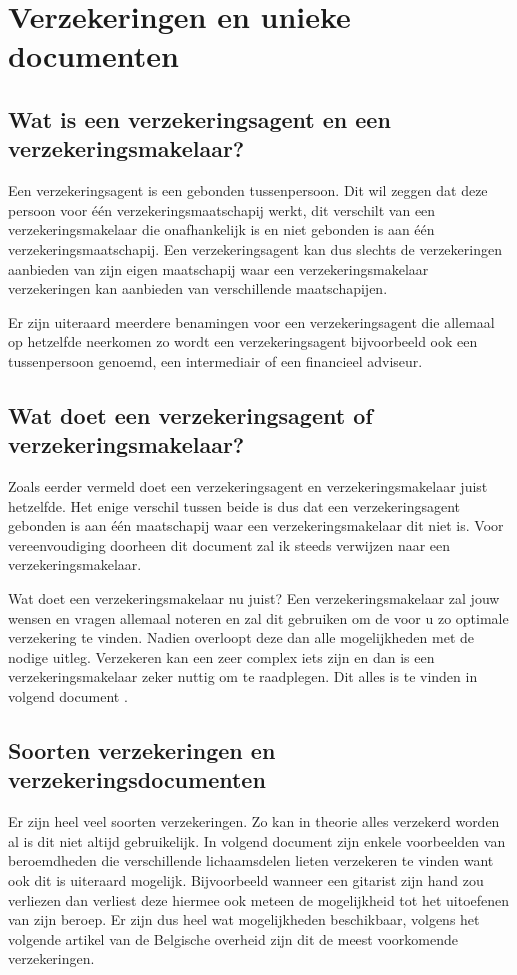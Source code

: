 \section{Verzekeringen en unieke documenten}
\subsection{Wat is een verzekeringsagent en een verzekeringsmakelaar?}
Een verzekeringsagent is een gebonden tussenpersoon. Dit wil zeggen dat deze persoon voor één verzekeringsmaatschapij werkt, dit verschilt van een verzekeringsmakelaar die onafhankelijk is en niet gebonden is aan één verzekeringsmaatschapij. Een verzekeringsagent kan dus slechts de verzekeringen aanbieden van zijn eigen maatschapij waar een verzekeringsmakelaar verzekeringen kan aanbieden van verschillende maatschapijen. 

Er zijn uiteraard meerdere benamingen voor een verzekeringsagent die allemaal op hetzelfde neerkomen zo wordt een verzekeringsagent bijvoorbeeld ook een tussenpersoon genoemd, een intermediair of een financieel adviseur. 

\subsection{Wat doet een verzekeringsagent of verzekeringsmakelaar?}
Zoals eerder vermeld doet een verzekeringsagent en verzekeringsmakelaar juist hetzelfde. Het enige verschil tussen beide is dus dat een verzekeringsagent gebonden is aan één maatschapij waar een verzekeringsmakelaar dit niet is. Voor vereenvoudiging doorheen dit document zal ik steeds verwijzen naar een verzekeringsmakelaar. 

Wat doet een verzekeringsmakelaar nu juist? Een verzekeringsmakelaar zal jouw wensen en vragen allemaal noteren en zal dit gebruiken om de voor u zo optimale verzekering te vinden. Nadien overloopt deze dan alle mogelijkheden met de nodige uitleg. Verzekeren kan een zeer complex iets zijn en dan is een verzekeringsmakelaar zeker nuttig om te raadplegen. Dit alles is te vinden in volgend document \textcite{Verzekeruzelf.nl}.

\subsection{Soorten verzekeringen en verzekeringsdocumenten}
Er zijn heel veel soorten verzekeringen. Zo kan in theorie alles verzekerd worden al is dit niet altijd gebruikelijk. In volgend document \textcite{verzekeringen.com2015} zijn enkele voorbeelden van beroemdheden die verschillende lichaamsdelen lieten verzekeren te vinden want ook dit is uiteraard mogelijk. Bijvoorbeeld wanneer een gitarist zijn hand zou verliezen dan verliest deze hiermee ook meteen de mogelijkheid tot het uitoefenen van zijn beroep. Er zijn dus heel wat mogelijkheden beschikbaar, volgens het volgende artikel \textcite{BFOverzekeringen} van de Belgische overheid zijn dit de meest voorkomende verzekeringen.

